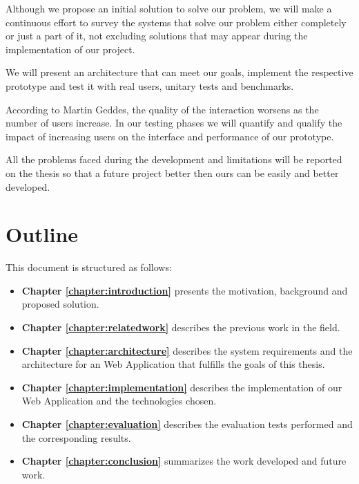 	Although we propose an initial solution to solve our problem, we will make a continuous effort to survey the systems that solve our problem either completely or just a part of it, not excluding solutions that may appear during the implementation of our project.

	We will present an architecture that can meet our goals, implement the respective prototype and test it with real users, unitary tests and benchmarks.

	According to Martin Geddes, the quality of the interaction worsens as the number of users increase\cite{geddes}. In our testing phases we will quantify and qualify the impact of increasing users on the interface and performance of our prototype. 

	All the problems faced during the development and limitations will be reported on the thesis so that a future project better then ours can be easily and better developed.



\section{Outline}

This document is structured as follows:

\begin{itemize}
\item \textbf{Chapter \ref{chapter:introduction}} presents the motivation, background and proposed solution.
\item \textbf{Chapter \ref{chapter:relatedwork}} describes the previous work in the field.
\item \textbf{Chapter \ref{chapter:architecture}} describes the system requirements and the architecture for an Web Application that fulfills the goals of this thesis.
\item \textbf{Chapter \ref{chapter:implementation}} describes the implementation of our Web Application and the technologies chosen.
\item \textbf{Chapter \ref{chapter:evaluation}} describes the evaluation tests performed and the corresponding results.
\item \textbf{Chapter \ref{chapter:conclusion}} summarizes the work developed and future work.
\end{itemize}

\cleardoublepage
